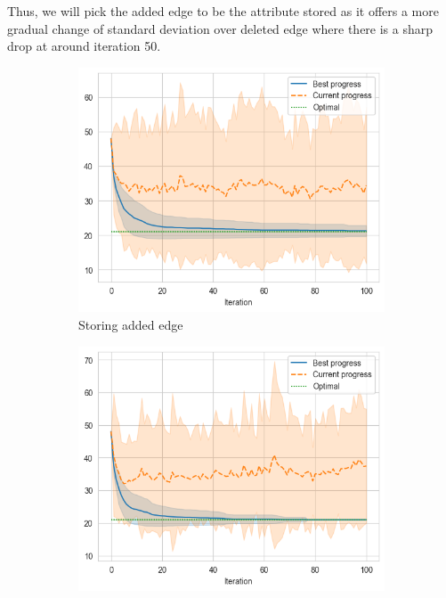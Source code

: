 Thus, we will pick the added edge to be the attribute stored as it offers a more gradual change of standard deviation over deleted edge where there is a sharp drop at around iteration 50.

\begin{figure}[ht]
    \centering
    \hfill
    \begin{subfigure}{0.32\textwidth}
        \centering
        \includegraphics[width=\textwidth]{../images/p1/added34s.png}
        \caption{Storing added edge}
    \end{subfigure}
    \hfill
    \begin{subfigure}{0.32\textwidth}
        \centering
        \includegraphics[width=\textwidth]{../images/p1/deleted34s.png}

\end{subfigure}
\end{figure}
